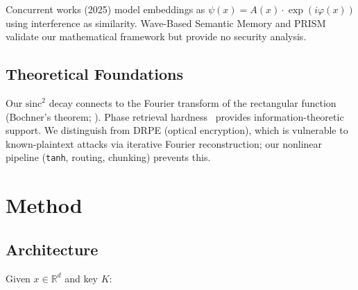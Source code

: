 \documentclass{article}
\begin{document}
Concurrent works (2025) model embeddings as $\psi(x)=A(x)\cdot\exp(i\varphi(x))$ using interference as similarity.
Wave-Based Semantic Memory and PRISM validate our mathematical framework but provide no security analysis.

\subsection{Theoretical Foundations}

Our $\mathrm{sinc}^2$ decay connects to the Fourier transform of the rectangular function (Bochner's theorem; \citealt{rahimi2007}).
Phase retrieval hardness~\citep{maillard2020} provides information-theoretic support.
We distinguish from DRPE (optical encryption), which is vulnerable to known-plaintext attacks via iterative Fourier reconstruction; our nonlinear pipeline (\texttt{tanh}, routing, chunking) prevents this.


\section{Method}
\label{sec:method}

\subsection{Architecture}

Given $x \in \mathbb{R}^d$ and key $K$:
\end{document}
